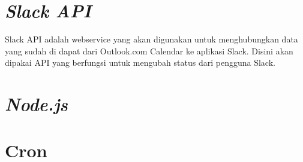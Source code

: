 \section{\textit{Slack API}}
\label{sec:slack}
Slack API adalah webservice yang akan digunakan untuk menghubungkan data yang sudah di dapat dari Outlook.com Calendar ke aplikasi Slack. Disini akan dipakai API yang berfungsi untuk mengubah status dari pengguna Slack. 


\section{\textit{Node.js}}
\label{sec:nodejs}


\section{Cron}
\label{sec:cron}
 
